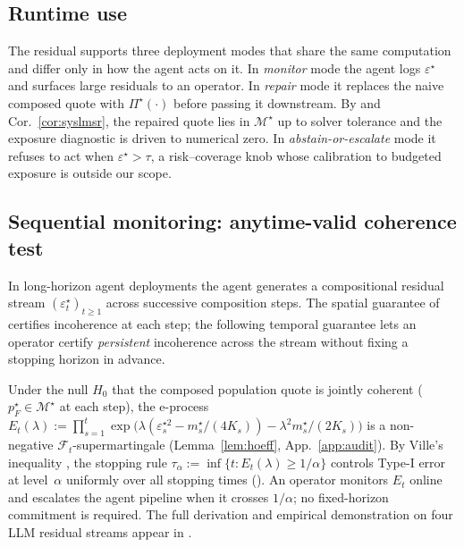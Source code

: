 \documentclass{article}
\theoremstyle{plain}
\theoremstyle{definition}
\theoremstyle{remark}
\newcommand{\Mjoint}{\mathcal{M}^{\star}}
\newcommand{\Pijoint}{\Pi^{\star}}
\newcommand{\eps}{\varepsilon}
\begin{document}
\subsection{Runtime use}
\label{sec:runtime}

The residual supports three deployment modes that share the same
computation and differ only in how the agent acts on it. In
\emph{monitor} mode the agent logs $\eps^\star$ and surfaces large
residuals to an operator. In \emph{repair} mode it replaces the naive composed quote with
$\Pijoint(\cdot)$ before passing it downstream. By
 and Cor.~\ref{cor:syslmsr}, the repaired quote
lies in $\Mjoint$ up to solver tolerance and the exposure
diagnostic is driven to numerical zero. In
\emph{abstain-or-escalate} mode it refuses to act when
$\eps^\star\!>\!\tau$, a risk--coverage knob whose calibration to
budgeted exposure is outside our scope.

\subsection{Sequential monitoring: anytime-valid coherence test}
\label{sec:sequential}

In long-horizon agent deployments the agent generates a
compositional residual stream $(\eps^\star_t)_{t\ge 1}$ across
successive composition steps. The spatial guarantee of
 certifies incoherence at each step; the
following temporal guarantee lets an operator certify
\emph{persistent} incoherence across the stream without fixing
a stopping horizon in advance.

Under the null $H_0$ that the composed population quote is
jointly coherent ($p_F^\star\!\in\!\Mjoint$ at each step),
the e-process
\(
E_t(\lambda) := \prod_{s=1}^{t}
\exp\!\bigl(\lambda(\eps_s^{\star 2} - m_s^\star/(4K_s))
- \lambda^2 m_s^\star/(2K_s)\bigr)
\)
is a non-negative $\mathcal{F}_t$-supermartingale
(Lemma~\ref{lem:hoeff}, App.~\ref{app:audit}). By Ville's
inequality \citep{ville1939etude,howard2021time}, the stopping
rule $\tau_\alpha := \inf\{t : E_t(\lambda)\ge 1/\alpha\}$
controls Type-I error at level~$\alpha$ uniformly over all
stopping times (). An operator monitors $E_t$
online and escalates the agent pipeline when it crosses
$1/\alpha$; no fixed-horizon commitment is required. The full
derivation and empirical demonstration on four LLM residual
streams appear in .

\end{document}
